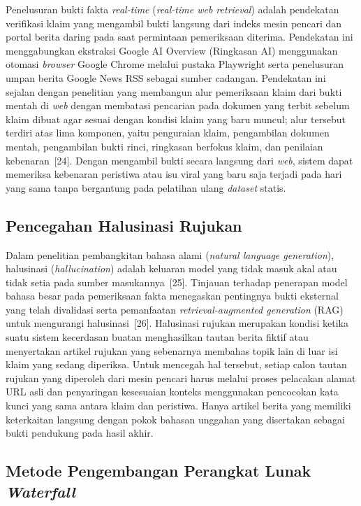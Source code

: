 \documentclass[12pt,a4paper,twoside]{report}
\begin{document}
Penelusuran bukti fakta \textit{real-time} (\textit{real-time web retrieval}) adalah pendekatan verifikasi klaim yang mengambil bukti langsung dari indeks mesin pencari dan portal berita daring pada saat permintaan pemeriksaan diterima. Pendekatan ini menggabungkan ekstraksi Google AI Overview (Ringkasan AI) menggunakan otomasi \textit{browser} Google Chrome melalui pustaka Playwright serta penelusuran umpan berita Google News RSS sebagai sumber cadangan. Pendekatan ini sejalan dengan penelitian yang membangun alur pemeriksaan klaim dari bukti mentah di \textit{web} dengan membatasi pencarian pada dokumen yang terbit sebelum klaim dibuat agar sesuai dengan kondisi klaim yang baru muncul; alur tersebut terdiri atas lima komponen, yaitu penguraian klaim, pengambilan dokumen mentah, pengambilan bukti rinci, ringkasan berfokus klaim, dan penilaian kebenaran~[24]. Dengan mengambil bukti secara langsung dari \textit{web}, sistem dapat memeriksa kebenaran peristiwa atau isu viral yang baru saja terjadi pada hari yang sama tanpa bergantung pada pelatihan ulang \textit{dataset} statis.

\subsection{Pencegahan Halusinasi Rujukan}

Dalam penelitian pembangkitan bahasa alami (\textit{natural language generation}), halusinasi (\textit{hallucination}) adalah keluaran model yang tidak masuk akal atau tidak setia pada sumber masukannya~[25]. Tinjauan terhadap penerapan model bahasa besar pada pemeriksaan fakta menegaskan pentingnya bukti eksternal yang telah divalidasi serta pemanfaatan \textit{retrieval-augmented generation} (RAG) untuk mengurangi halusinasi~[26]. Halusinasi rujukan merupakan kondisi ketika suatu sistem kecerdasan buatan menghasilkan tautan berita fiktif atau menyertakan artikel rujukan yang sebenarnya membahas topik lain di luar isi klaim yang sedang diperiksa. Untuk mencegah hal tersebut, setiap calon tautan rujukan yang diperoleh dari mesin pencari harus melalui proses pelacakan alamat URL asli dan penyaringan kesesuaian konteks menggunakan pencocokan kata kunci yang sama antara klaim dan peristiwa. Hanya artikel berita yang memiliki keterkaitan langsung dengan pokok bahasan unggahan yang disertakan sebagai bukti pendukung pada hasil akhir.

\subsection{Metode Pengembangan Perangkat Lunak \textit{Waterfall}}\label{sub:waterfall}
\end{document}
